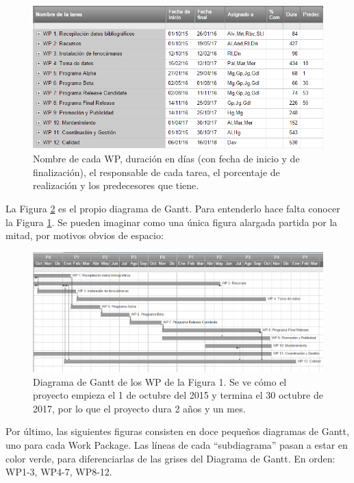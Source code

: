 \documentclass[12pt,oneside,a4paper]{article}
\numberwithin{figure}{section}
\begin{document}
\begin{figure}[H]
\begin{center}
\includegraphics[scale=.8]{Gant1.png}
\caption{Nombre de cada WP, duración en días (con fecha de inicio y de finalización), el responsable de cada tarea, el porcentaje de realización y los predecesores que tiene.}
\label{fig:Gantt1}
\end{center}
\end{figure}

La Figura \ref{fig:Gantt2} es el propio diagrama de Gantt. Para entenderlo hace falta conocer la Figura \ref{fig:Gantt1}. Se pueden imaginar como una única figura alargada partida por la mitad, por motivos obvios de espacio:

\begin{figure}[H]
\begin{center}
\includegraphics[scale=.7]{Gant2.png}
\caption{Diagrama de Gantt de los WP de la Figura 1. Se ve cómo el proyecto empieza el 1 de octubre del 2015 y termina el 30 octubre de 2017, por lo que el proyecto dura 2 años y un mes.}
\label{fig:Gantt2}
\end{center}
\end{figure}

Por último, las siguientes figuras consisten en doce pequeños diagramas de Gantt, uno para cada Work Package. Las líneas de cada “subdiagrama” pasan a estar en color verde, para diferenciarlas de las grises del Diagrama de Gantt. En orden: WP1-3, WP4-7, WP8-12.
\end{document}

